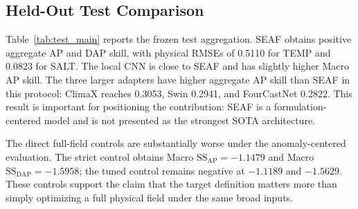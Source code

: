 \documentclass[conference]{IEEEtran}
\begin{document}
\subsection{Held-Out Test Comparison}
Table~\ref{tab:test_main} reports the frozen test aggregation. SEAF obtains positive aggregate AP and DAP skill, with physical RMSEs of 0.5110 for TEMP and 0.0823 for SALT. The local CNN is close to SEAF and has slightly higher Macro AP skill. The three larger adapters have higher aggregate AP skill than SEAF in this protocol: ClimaX reaches 0.3053, Swin 0.2941, and FourCastNet 0.2822. This result is important for positioning the contribution: SEAF is a formulation-centered model and is not presented as the strongest SOTA architecture.

The direct full-field controls are substantially worse under the anomaly-centered evaluation. The strict control obtains Macro $\mathrm{SS}_{\mathrm{AP}}=-1.1479$ and Macro $\mathrm{SS}_{\mathrm{DAP}}=-1.5958$; the tuned control remains negative at $-1.1189$ and $-1.5629$. These controls support the claim that the target definition matters more than simply optimizing a full physical field under the same broad inputs.
\end{document}
